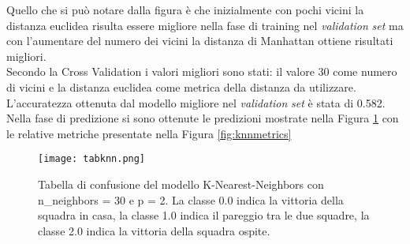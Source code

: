 Quello che si può notare dalla figura è che inizialmente con pochi vicini la distanza euclidea risulta essere migliore nella fase di training nel \emph{validation} \emph{set} ma con l'aumentare del numero dei vicini la distanza di Manhattan ottiene risultati migliori. \\
Secondo la Cross Validation i valori migliori sono stati: il valore 30 come numero di vicini e la distanza euclidea come metrica della distanza da utilizzare. L'accuratezza ottenuta dal modello migliore nel \emph{validation} \emph{set} è stata di 0.582.\\
Nella fase di predizione si sono ottenute le predizioni mostrate nella Figura \ref{fig:knnpre} con le relative metriche presentate nella Figura \ref{fig:knnmetrics}

\begin{figure}[h]
	\begin{center}
		\texttt{[image: tabknn.png]}
		\caption{Tabella di confusione del modello K-Nearest-Neighbors con\textsf{ n\_neighbors} = 30 e \textsf{p} = 2. La classe 0.0 indica la vittoria della squadra in casa, la classe 1.0 indica il pareggio tra le due squadre, la classe 2.0 indica la vittoria della squadra ospite.
		} 
		\label{fig:knnpre}
	\end{center}
\end{figure}

